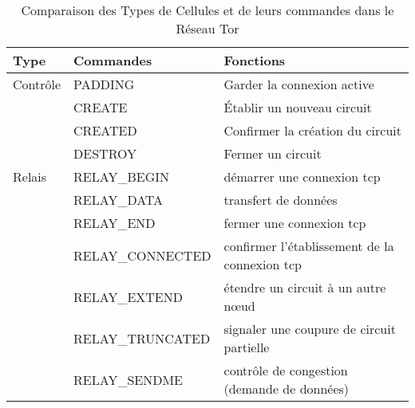 \begin{table}[htbp]
    \centering
    \begin{tabularx}{\textwidth}{
        >{\raggedright\arraybackslash}p{2cm} 
        >{\raggedright\arraybackslash}X 
        >{\raggedright\arraybackslash}X}
            \toprule
            \rowcolor[HTML]{EFEFEF}
            \textbf{Type}           & \textbf{Commandes}        & \textbf{Fonctions} \\
            \midrule
            Contrôle & PADDING & Garder la connexion active \\
            & CREATE & Établir un nouveau circuit \\
            & CREATED & Confirmer la création du circuit \\
            & DESTROY & Fermer un circuit \\
            \addlinespace
            Relais & RELAY\_BEGIN & démarrer une connexion \acrshort{tcp} \\
            & RELAY\_DATA & transfert de données \\
            & RELAY\_END & fermer une connexion \acrshort{tcp} \\
            & RELAY\_CONNECTED & confirmer l'établissement de la connexion \acrshort{tcp} \\
            & RELAY\_EXTEND & étendre un circuit à un autre nœud \\
            & RELAY\_TRUNCATED & signaler une coupure de circuit partielle \\
            & RELAY\_SENDME & contrôle de congestion (demande de données) \\
            \bottomrule
    \end{tabularx}
    \caption{Comparaison des Types de Cellules et de leurs commandes dans le Réseau Tor}
    \label{tab:cellules-tor}
\end{table}